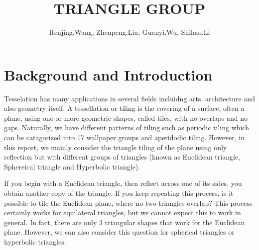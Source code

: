 \documentclass{article}
\begin{document}
\title{TRIANGLE GROUP}
\author{Renjing.Wang, Zhenpeng.Liu, Guanyi.Wu, Shihao.Li}
\maketitle

\section{Background and Introduction}%
Tesselation has many applications in several fields incluidng arts, architecture and also geometry itself. A tessellation or tiling is the covering of a surface, often a plane, using one or more geometric shapes, called tiles, with no overlaps and no gaps. Naturally, we have different patterns of tiling such as periodic tiling which can be catagorized into 17 wallpaper groups and aperidodic tiling. However, in this report, we mainly consider the triangle tiling of the plane using only reflection but with  different groups of triangles (known as Euclidean triangle, Sphereical triangle and Hyperbolic triangle).

If you begin with a Euclidean triangle, then reflect across one of its sides, you obtain another copy of the triangle. If you keep repeating this process, is it possible to tile the Euclidean plane, where no two triangles overlap? This process certainly works for equilateral triangles, but we cannot expect this to work in general. In fact, there are only 3 triangular shapes that work for the Euclidean plane. However, we can also consider this question for spherical triangles or hyperbolic triangles.
\end{document}
